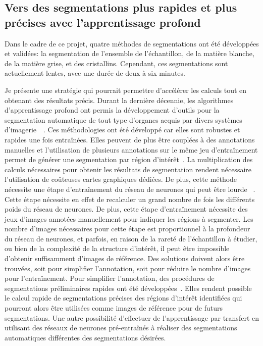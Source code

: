 \documentclass[\main/main.tex]{subfiles}
\begin{document}
    \subsection{Vers des segmentations plus rapides et plus précises avec l'apprentissage profond}

%    
Dans le cadre de ce projet, quatre méthodes de segmentations ont été développées et validées: la segmentation de l'ensemble de l'échantillon, de la matière blanche, de la matière grise, et des cristallins.
%
Cependant, ces segmentations sont actuellement lentes, avec une durée de deux à six minutes.

Je présente une stratégie qui pourrait permettre d'accélérer les calculs tout en obtenant des résultats précis.
%
Durant la dernière décennie, les algorithmes d'apprentissage profond ont permis la développement d'outils pour la segmentation automatique de tout type d'organes acquis par divers systèmes d'imagerie~\cite{gottapu_2018,oztel_2017,zhang_2020,hossain_2019}~\cite{long_2015,ronneberger_2015,Milletari_2016}.
%
Ces méthodologies ont été développé car elles sont robustes et rapides une fois entraînées. Elles peuvent de plus être couplées à des annotations manuelles et l'utilisation de plusieurs annotations sur le même jeu d'entraînement permet de générer une segmentation par région d'intérêt~\cite{zhao_2019,tong_2018,feng_2019}.
%
La multiplication des calculs nécessaires pour obtenir les résultats de segmentation rendent nécessaire l'utilisation de coûteuses cartes graphiques dédiées.
%
De plus, cette méthode nécessite une étape d'entraînement du réseau de neurones qui peut être lourde ~\cite{ghafoorian_2017,jiang_2018,xu_2018}.
%
Cette étape nécessite en effet de recalculer un grand nombre de fois les différents poids du réseau de neurones. De plus, cette étape d'entraînement nécessite des jeux d'images annotées manuellement pour indiquer les régions à segmenter. 
%
Les nombre d'images nécessaires pour cette étape est proportionnel à la profondeur du réseau de neurones, et parfois, en raison de la rareté de l'échantillon à étudier, ou bien de la complexité de la structure d'intérêt, il peut être impossible d'obtenir suffisamment d'images de référence. Des solutions doivent alors être trouvées, soit pour simplifier l'annotation, soit pour réduire le nombre d'images pour l'entraînement.
%
Pour simplifier l'annotation, des procédures de segmentations préliminaires rapides ont été développées~\cite{rajchl_2017}. Elles rendent possible le calcul rapide de segmentations précises des régions d'intérêt identifiées qui pourront alors être utilisées comme images de référence pour de futurs segmentations.
%
Une autre possibilité  d'effectuer de l'apprentissage par transfert en utilisant des réseaux de neurones pré-entraînés à réaliser des segmentations automatiques différentes des segmentations désirées.
\end{document}

